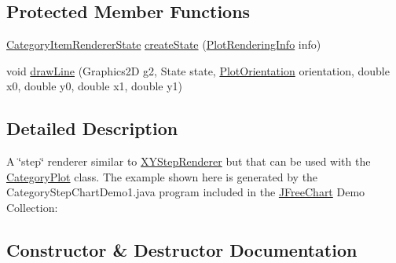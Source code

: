 \subsection*{Protected Member Functions}
\begin{DoxyCompactItemize}
\item 
\mbox{\hyperlink{classorg_1_1jfree_1_1chart_1_1renderer_1_1category_1_1_category_item_renderer_state}{Category\+Item\+Renderer\+State}} \mbox{\hyperlink{classorg_1_1jfree_1_1chart_1_1renderer_1_1category_1_1_category_step_renderer_a22dedf570415e10a957322c99e9d823b}{create\+State}} (\mbox{\hyperlink{classorg_1_1jfree_1_1chart_1_1plot_1_1_plot_rendering_info}{Plot\+Rendering\+Info}} info)
\item 
void \mbox{\hyperlink{classorg_1_1jfree_1_1chart_1_1renderer_1_1category_1_1_category_step_renderer_a237a892add4b58f7594f96d6dc87fbe5}{draw\+Line}} (Graphics2D g2, State state, \mbox{\hyperlink{classorg_1_1jfree_1_1chart_1_1plot_1_1_plot_orientation}{Plot\+Orientation}} orientation, double x0, double y0, double x1, double y1)
\end{DoxyCompactItemize}


\subsection{Detailed Description}
A \char`\"{}step\char`\"{} renderer similar to \mbox{\hyperlink{}{X\+Y\+Step\+Renderer}} but that can be used with the \mbox{\hyperlink{}{Category\+Plot}} class. The example shown here is generated by the {\ttfamily Category\+Step\+Chart\+Demo1.\+java} program included in the \mbox{\hyperlink{classorg_1_1jfree_1_1chart_1_1_j_free_chart}{J\+Free\+Chart}} Demo Collection\+: ~\newline
~\newline
  

\subsection{Constructor \& Destructor Documentation}
\mbox{\label{classorg_1_1jfree_1_1chart_1_1renderer_1_1category_1_1_category_step_renderer_ac1c44bbc5a49616c45fd71263aa670a6}} 
